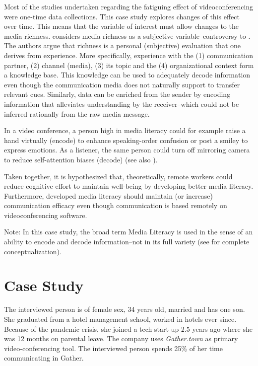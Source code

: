 \documentclass[man]{apa7}
\begin{document}
Most of the studies undertaken regarding the fatiguing effect of videoconferencing were one-time data collections. This case study explores changes of this effect over time. This means that the variable of interest must allow changes to the media richness. \cite{Carlson1999} considers media richness as a subjective variable–controversy to \citeauthor{daft1983information}. The authors argue that richness is a personal (subjective) evaluation that one derives from experience. More specifically, experience with the (1) communication partner, (2) channel (media), (3) its topic and the (4) organizational context form a knowledge base. This knowledge can be used to adequately decode information even though the communication media does not naturally support to transfer relevant cues. Similarly, data can be enriched from the sender by encoding information that alleviates understanding by the receiver–which could not be inferred rationally from the raw media message.

In a video conference, a person high in media literacy could for example raise a hand virtually (encode) to enhance speaking-order confusion or post a smiley to express emotions. As a listener, the same person could turn off mirroring camera to reduce self-attention biases (decode) (see also \cite{Riedl2021}).

Taken together, it is hypothesized that, theoretically, remote workers could reduce cognitive effort to maintain well-being by developing better media literacy. Furthermore, developed media literacy should maintain (or increase) communication efficacy even though communication is based remotely on videoconferencing software.

Note: In this case study, the broad term Media Literacy is used in the sense of an ability to encode and decode information–not in its full variety (see \cite{Potter2010} for complete conceptualization).


\section{Case Study}

The interviewed person is of female sex, 34 years old, married and has one son. She graduated from a hotel management school, worked in hotels ever since. Because of the pandemic crisis, she joined a tech start-up 2.5 years ago where she was 12 months on parental leave. The company uses \textit{Gather.town} as primary video-conferencing tool. The interviewed person spends 25\% of her time communicating in Gather.
\end{document}
